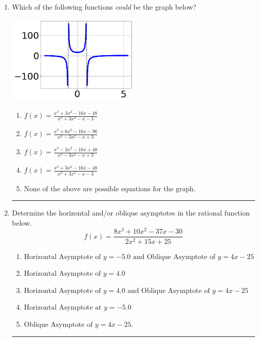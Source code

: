 \documentclass[14pt]{extbook}
\newcommand{\litem}[1]{\item#1\hspace*{-1cm}\rule{\textwidth}{0.4pt}}
\begin{document}
\begin{enumerate}
{\begin{enumerate}[label=\Alph*.]
\end{enumerate} }
\litem{
Which of the following functions \textit{could} be the graph below?
\begin{center}
    \includegraphics[width=0.5\textwidth]{../Figures/identifyGraphOfRationalFunctionCopyA.png}
\end{center}
\begin{enumerate}[label=\Alph*.]
\item \( f(x)=\frac{x^{3} +3 x^{2} -16 x -48}{x^{3} +3 x^{2} -x -3} \)
\item \( f(x)=\frac{x^{3} +6 x^{2} -16 x -96}{x^{3} -3 x^{2} -x + 3} \)
\item \( f(x)=\frac{x^{3} -3 x^{2} -16 x + 48}{x^{3} -3 x^{2} -x + 3} \)
\item \( f(x)=\frac{x^{3} +3 x^{2} -16 x -48}{x^{3} +3 x^{2} -x -3} \)
\item \( \text{None of the above are possible equations for the graph.} \)

\end{enumerate} }
\litem{
Determine the horizontal and/or oblique asymptotes in the rational function below.\[ f(x) = \frac{8x^{3} +10 x^{2} -37 x -30}{2x^{2} +15 x + 25} \]\begin{enumerate}[label=\Alph*.]
\item \( \text{Horizontal Asymptote of } y = -5.0 \text{ and Oblique Asymptote of } y = 4x -25 \)
\item \( \text{Horizontal Asymptote of } y = 4.0  \)
\item \( \text{Horizontal Asymptote of } y = 4.0 \text{ and Oblique Asymptote of } y = 4x -25 \)
\item \( \text{Horizontal Asymptote at } y = -5.0 \)
\item \( \text{Oblique Asymptote of } y = 4x -25. \)


\end{enumerate}}
\end{enumerate}
\end{document}
